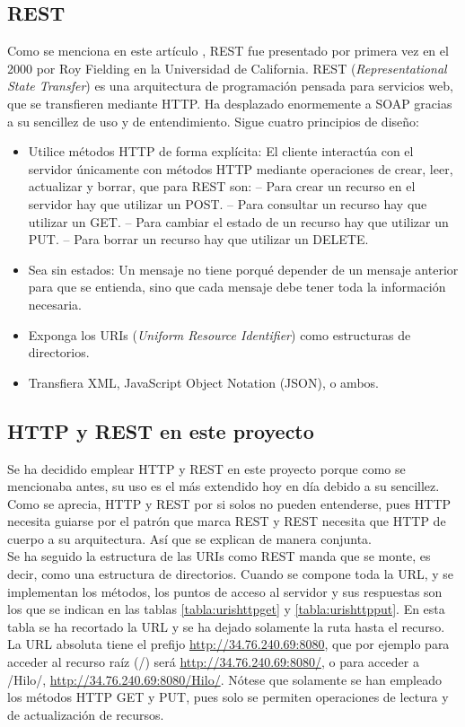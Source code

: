 \documentclass[12pt,spanish,listoffigures,listoftables]{tfgetsinf}
\begin{document}
\subsection{REST}
Como se menciona en este artículo \cite{PrincipiosREST}, REST fue presentado por primera vez en el 2000 por Roy Fielding en la Universidad de California. REST (\textit{Representational State Transfer}) es una arquitectura de programación pensada para servicios web, que se transfieren mediante HTTP. Ha desplazado enormemente a SOAP gracias a su sencillez de uso y de entendimiento. Sigue cuatro principios de diseño:
\begin{itemize}
	\item Utilice métodos HTTP de forma explícita: El cliente interactúa con el servidor únicamente con métodos HTTP mediante operaciones de crear, leer, actualizar y borrar, que para REST son:
		\subitem -- Para crear un recurso en el servidor hay que utilizar un POST.
		\subitem -- Para consultar un recurso hay que utilizar un GET.
		\subitem -- Para cambiar el estado de un recurso hay que utilizar un PUT.
		\subitem -- Para borrar un recurso hay que utilizar un DELETE.
	\item Sea sin estados: Un mensaje no tiene porqué depender de un mensaje anterior para que se entienda, sino que cada mensaje debe tener toda la información necesaria.
	\item Exponga los URIs (\textit{Uniform Resource Identifier}) como estructuras de directorios. 
	\item Transfiera XML, JavaScript Object Notation (JSON), o ambos.
\end{itemize}

\subsection{HTTP y REST en este proyecto}
Se ha decidido emplear HTTP y REST en este proyecto porque como se mencionaba antes, su uso es el más extendido hoy en día debido a su sencillez. \\

Como se aprecia, HTTP y REST por si solos no pueden entenderse, pues HTTP necesita guiarse por el patrón que marca REST y REST necesita que HTTP de cuerpo a su arquitectura. Así que se explican de manera conjunta. \\

Se ha seguido la estructura de las URIs como REST manda que se monte, es decir, como una estructura de directorios. Cuando se compone toda la URL, y se implementan los métodos, los puntos de acceso al servidor y sus respuestas son los que se indican en las tablas \ref{tabla:urishttpget} y \ref{tabla:urishttpput}. En esta tabla se ha recortado la URL y se ha dejado solamente la ruta hasta el recurso. La URL absoluta tiene el prefijo \url{http://34.76.240.69:8080}, que por ejemplo para acceder al recurso raíz (/) será \url{http://34.76.240.69:8080/}, o para acceder a /Hilo/, \url{http://34.76.240.69:8080/Hilo/}. Nótese que solamente se han empleado los métodos HTTP GET y PUT, pues solo se permiten operaciones de lectura y de actualización de recursos.
\end{document}
